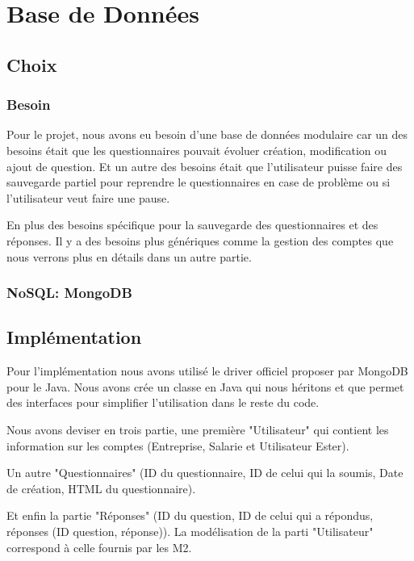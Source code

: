 \section{Base de Données}

\subsection{Choix}

\subsubsection{Besoin}

Pour le projet, nous avons eu besoin d'une base de données modulaire car un des besoins était que les questionnaires pouvait évoluer création, modification ou ajout de question. Et un autre des besoins était que l'utilisateur puisse faire des sauvegarde partiel pour reprendre le questionnaires en case de problème ou si l'utilisateur veut faire une pause. 

En plus des besoins spécifique pour la sauvegarde des questionnaires et des réponses. Il y a des besoins plus génériques comme la gestion des comptes que nous verrons plus en détails dans un autre partie.

\subsubsection{NoSQL: MongoDB}


\subsection{Implémentation}

Pour l'implémentation nous avons utilisé le driver officiel proposer par MongoDB pour le Java. Nous avons crée un classe en Java qui nous héritons et que permet des interfaces pour simplifier l'utilisation dans le reste du code.

Nous avons deviser en trois partie, une première "Utilisateur" qui contient les information sur les comptes (Entreprise, Salarie et Utilisateur Ester).

Un autre "Questionnaires" (ID du questionnaire, ID de celui qui la soumis, Date de création, HTML du questionnaire). 

Et enfin la partie "Réponses" (ID du question, ID de celui qui a répondus, réponses (ID question, réponse)). La modélisation de la parti "Utilisateur" correspond à celle fournis par les M2.

